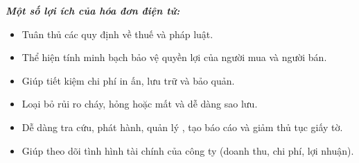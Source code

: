 \textbf{\textit{Một số lợi ích của hóa đơn điện tử:}}


\begin{itemize}
    \item Tuân thủ các quy định về thuế và pháp luật.
   
    \item Thể hiện tính minh bạch   bảo vệ quyền lợi của   người mua và người bán.

\item Giúp tiết kiệm chi phí in ấn, lưu trữ và bảo quản.

\item Loại bỏ rủi ro cháy, hỏng hoặc mất và dễ dàng sao lưu.

\item Dễ dàng tra cứu, phát hành, quản lý , tạo báo cáo  và giảm thủ tục giấy tờ.


\item Giúp theo dõi tình hình tài chính của công ty (doanh thu, chi phí, lợi nhuận).


\end{itemize}

